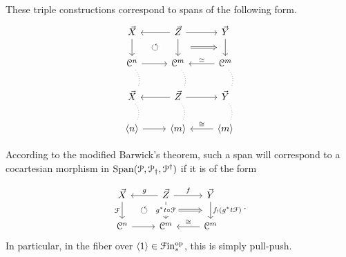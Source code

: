 \documentclass[main.tex]{subfiles}
\begin{document}
These triple constructions correspond to spans of the following form.
\begin{equation*}
  \begin{tikzcd}
    \vec{X}
    \arrow[d, ""{name=L, right}]
    & \vec{Z}
    \arrow[d, ""{name=ML, left}, ""{name=MR, right}]
    \arrow[r]
    \arrow[l]
    & \vec{Y}
    \arrow[d, ""{name=R, right}]
    \\
    \category{C}^{n}
    \arrow[d, no head, dotted, bend left]
    \arrow[r]
    & \category{C}^{m}
    \arrow[d, no head, dotted, bend left]
    & \category{C}^{m}
    \arrow[l, swap, "\simeq"]
    \arrow[d, no head, dotted, bend left]
    \\
    \vec{X}
    \arrow[d, no head, dotted, bend left]
    & \vec{Z}
    \arrow[d, no head, dotted, bend left]
    \arrow[r]
    \arrow[l]
    & \vec{Y}
    \arrow[d, no head, dotted, bend left]
    \\
    \langle n \rangle
    \arrow[r]
    & \langle m \rangle
    & \langle m \rangle
    \arrow[l, swap, "\cong"]
    \arrow[from=ML, to=L, phantom, shorten=1.5ex, "\circlearrowleft"{description}]
    \arrow[from=MR, to=R, Rightarrow, shorten=2ex]
  \end{tikzcd}
\end{equation*}

According to the modified Barwick's theorem, such a span will correspond to a cocartesian morphism in $\mathrm{Span}(\mathcal{P}, \mathcal{P}_{\dagger}, \mathcal{P}^{\dagger})$ if it is of the form

\begin{equation*}
  \begin{tikzcd}
    \vec{X}
    \arrow[d, "\mathcal{F}"{left}, ""{name=L, right}]
    & \vec{Z}
    \arrow[d, "g^{*}t \circ \mathcal{F}"{description}, ""{name=ML, left}, ""{name=MR, right}]
    \arrow[r, "f"]
    \arrow[l, swap, "g"]
    & \vec{Y}
    \arrow[d, ""{name=R, right}, "f_{!}(g^{*}t\mathcal{F})"]
    \\
    \category{C}^{n}
    \arrow[r]
    & \category{C}^{m}
    & \category{C}^{m}
    \arrow[l, swap, "\cong"]
    \arrow[from=ML, to=L, phantom, shorten=1.5ex, "\circlearrowleft"{description}]
    \arrow[from=MR, to=R, Rightarrow, shorten=2ex]
  \end{tikzcd}.
\end{equation*}
In particular, in the fiber over $\langle 1 \rangle \in \mathcal{F}\mathrm{in}_{*}^{\mathrm{op}}$, this is simply pull-push.
\end{document}
